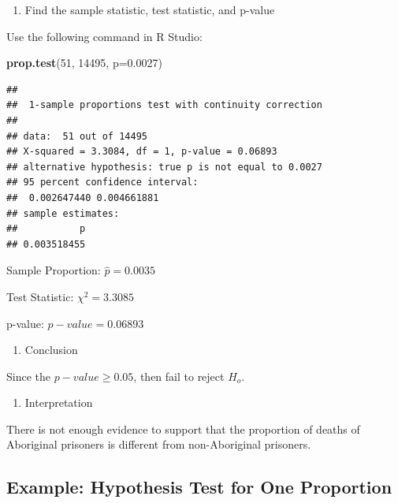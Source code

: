\documentclass[
]{book}
\newenvironment{Shaded}{\begin{snugshade}}{\end{snugshade}}
\newcommand{\DataTypeTok}[1]{\textcolor[rgb]{0.13,0.29,0.53}{#1}}
\newcommand{\DecValTok}[1]{\textcolor[rgb]{0.00,0.00,0.81}{#1}}
\newcommand{\FloatTok}[1]{\textcolor[rgb]{0.00,0.00,0.81}{#1}}
\newcommand{\KeywordTok}[1]{\textcolor[rgb]{0.13,0.29,0.53}{\textbf{#1}}}
\newcommand{\NormalTok}[1]{#1}
\providecommand{\tightlist}{%
  \setlength{\itemsep}{0pt}\setlength{\parskip}{0pt}}
\begin{document}
\begin{enumerate}
\def\labelenumi{\arabic{enumi}.}
\setcounter{enumi}{3}
\tightlist
\item
  Find the sample statistic, test statistic, and p-value
\end{enumerate}

Use the following command in R Studio:

\begin{Shaded}
\begin{Highlighting}[]
\KeywordTok{prop.test}\NormalTok{(}\DecValTok{51}\NormalTok{, }\DecValTok{14495}\NormalTok{, }\DataTypeTok{p=}\FloatTok{0.0027}\NormalTok{)}
\end{Highlighting}
\end{Shaded}

\begin{verbatim}
## 
##  1-sample proportions test with continuity correction
## 
## data:  51 out of 14495
## X-squared = 3.3084, df = 1, p-value = 0.06893
## alternative hypothesis: true p is not equal to 0.0027
## 95 percent confidence interval:
##  0.002647440 0.004661881
## sample estimates:
##           p 
## 0.003518455
\end{verbatim}

Sample Proportion: \(\hat{p}=0.0035\)

Test Statistic: \(\chi^2=3.3085\)

p-value: \(p-value=0.06893\)

\begin{enumerate}
\def\labelenumi{\arabic{enumi}.}
\setcounter{enumi}{4}
\tightlist
\item
  Conclusion
\end{enumerate}

Since the \(p-value\ge0.05\), then fail to reject \(H_o\).

\begin{enumerate}
\def\labelenumi{\arabic{enumi}.}
\setcounter{enumi}{5}
\tightlist
\item
  Interpretation
\end{enumerate}

There is not enough evidence to support that the proportion of deaths of Aboriginal prisoners is different from non-Aboriginal prisoners.

\hypertarget{example-hypothesis-test-for-one-proportion-1}{%
\subsection{Example: Hypothesis Test for One Proportion}\label{example-hypothesis-test-for-one-proportion-1}}
\end{document}
